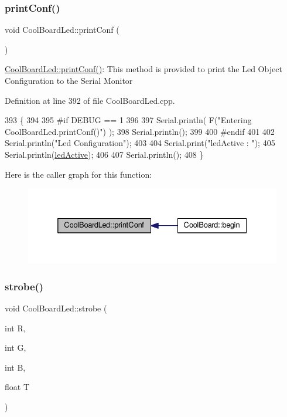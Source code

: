 \subsubsection{\texorpdfstring{print\+Conf()}{printConf()}}
{\footnotesize\ttfamily void Cool\+Board\+Led\+::print\+Conf (\begin{DoxyParamCaption}{ }\end{DoxyParamCaption})}

\hyperlink{class_cool_board_led_a8ed3053a36f0ed4a131f43b5b17efb61}{Cool\+Board\+Led\+::print\+Conf()}\+: This method is provided to print the Led Object Configuration to the Serial Monitor 

Definition at line 392 of file Cool\+Board\+Led.\+cpp.


\begin{DoxyCode}
393 \{
394 
395 \textcolor{preprocessor}{#if DEBUG == 1 }
396 
397     Serial.println( F(\textcolor{stringliteral}{"Entering CoolBoardLed.printConf()"}) );
398     Serial.println();
399 
400 \textcolor{preprocessor}{#endif}
401 
402     Serial.println(\textcolor{stringliteral}{"Led Configuration"});
403 
404     Serial.print(\textcolor{stringliteral}{"ledActive : "});
405     Serial.println(\hyperlink{class_cool_board_led_a5f17c135516fcf4b44ea8a096ba0177a}{ledActive});
406 
407     Serial.println();   
408 \}
\end{DoxyCode}
Here is the caller graph for this function\+:\nopagebreak
\begin{figure}[H]
\begin{center}
\leavevmode
\includegraphics[width=332pt]{de/dc0/class_cool_board_led_a8ed3053a36f0ed4a131f43b5b17efb61_icgraph}
\end{center}
\end{figure}
\mbox{\label{class_cool_board_led_ad5f0de4c628cbfbf49896042831c64ad}} 
\subsubsection{\texorpdfstring{strobe()}{strobe()}}
{\footnotesize\ttfamily void Cool\+Board\+Led\+::strobe (\begin{DoxyParamCaption}\item[{int}]{R,  }\item[{int}]{G,  }\item[{int}]{B,  }\item[{float}]{T }\end{DoxyParamCaption})}

